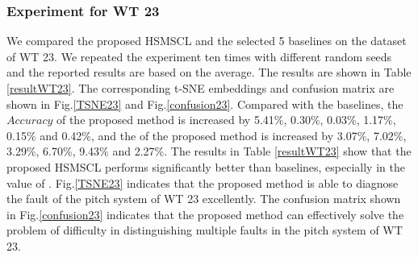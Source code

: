 \documentclass[lettersize,journal]{IEEEtran}
\begin{document}
\subsubsection{Experiment for WT 23}
 We compared the proposed HSMSCL and the selected 5 baselines on the dataset of WT 23. We repeated the experiment ten times with different random seeds and the reported results are based on the average. The results are shown in Table \ref{resultWT23}. The corresponding t-SNE embeddings and confusion matrix are shown in Fig.\ref{TSNE23} and Fig.\ref{confusion23}. Compared with the baselines, the $Accuracy$ of the proposed method is increased by 5.41\%, 0.30\%, 0.03\%, 1.17\%, 0.15\% and 0.42\%, and the  of the proposed method is increased by 3.07\%, 7.02\%, 3.29\%, 6.70\%, 9.43\% and 2.27\%. The results in Table \ref{resultWT23} show that the proposed HSMSCL performs significantly better than baselines, especially in the value of . Fig.\ref{TSNE23} indicates that the proposed method is able to diagnose the fault of the pitch system of WT 23 excellently. The confusion matrix shown in Fig.\ref{confusion23} indicates that the proposed method can effectively solve the problem of difficulty in distinguishing multiple faults in the pitch system of WT 23.

\end{document}
